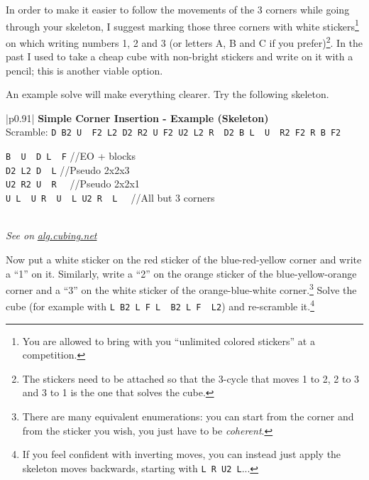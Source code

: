\documentclass[11pt,a4paper]{book}
\newcommand{\p}{\textquotesingle}
\newcommand{\m}{\texttt}
\newcommand{\ps}{\p\,\,}
\newcommand{\comment}[1]{{\color{gray}\quad//#1}}
\begin{document}
In order to make it easier to follow the movements of the 3 corners while going through your skeleton, I suggest marking those three corners with white stickers\footnote{You are allowed to bring with you “unlimited colored stickers” at a competition.} on which writing numbers 1, 2 and 3 (or letters A, B and C if you prefer)\footnote{The stickers need to be attached so that the 3-cycle that moves 1 to 2, 2 to 3 and 3 to 1 is the one that solves the cube.}. In the past I used to take a cheap cube with non-bright stickers and write on it with a pencil; this is another viable option.

An example solve will make everything clearer. Try the following skeleton.

\bigskip
\begin{tabular}{|p{}|}
\hline
\textbf{Simple Corner Insertion - Example (Skeleton)}\\
\hline
Scramble: \m{D B2 U\ps F2 L2 D2 R2 U F2 U2 L2 R\ps D2 B L\ps U\ps R2 F2 R B F2}\\
\hline
\begin{minipage}[l]{0.650\textwidth}
\m{B\ps U\ps D L\ps F\p} \comment{EO + blocks}\\
\m{D2 L2 D\ps L} \comment{Pseudo 2x2x3}\\
\m{U2 R2 U\ps R\ps} \comment{Pseudo 2x2x1}\\
\m{U L\ps U R\ps U\ps L U2 R\ps L\ps} \comment{All but 3 corners}
\end{minipage}
\begin{minipage}[c]{0.25\textwidth}

\end{minipage}\\
\hline
\emph{See on }\href{https://alg.cubing.net/?setup=D_B2_U-_F2_L2_D2_R2_U_F2_U2_L2_R-_D2_B_L-_U-_R2_F2_R_B_F2&alg=B-_U-_D_L-_F-_\%2F\%2FEO_\%26\%232b\%3B_blocks\%0AD2_L2_D-_L_\%2F\%2FPseudo1_2x2x3\%0AU2_R2_U-_R-_\%2F\%2FPseudo_2x2x1\%0AU_L-_U_R-_U-_L_U2_R-_L-_\%2F\%2FAll_but_3_corners}{\emph{alg.cubing.net}}\\
\hline
\end{tabular}
\bigskip

Now put a white sticker on the red sticker of the blue-red-yellow corner and write a ``1'' on it. Similarly, write a ``2'' on the orange sticker of the blue-yellow-orange corner and a ``3'' on the white sticker of the orange-blue-white corner.\footnote{There are many equivalent enumerations: you can start from the corner and from the sticker you wish, you just have to be \emph{coherent}.} Solve the cube (for example with \m{L B2 L F L\ps B2 L F\ps L2}) and re-scramble it.\footnote{If you feel confident with inverting moves, you can instead just apply the skeleton moves backwards, starting with \m{L R U2 L\p}...}
\end{document}
